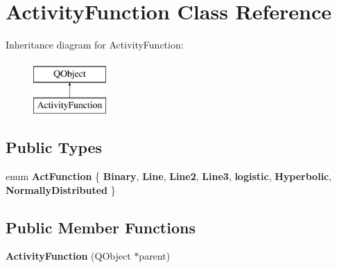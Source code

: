\hypertarget{class_activity_function}{}\section{Activity\+Function Class Reference}
\label{class_activity_function}
Inheritance diagram for Activity\+Function\+:\begin{figure}[H]
\begin{center}
\leavevmode
\includegraphics[height=2.000000cm]{class_activity_function}
\end{center}
\end{figure}
\subsection*{Public Types}
\begin{DoxyCompactItemize}
\item 
\hypertarget{class_activity_function_a53d67481011dce859413c787a1ba3ac9}{}\label{class_activity_function_a53d67481011dce859413c787a1ba3ac9} 
enum {\bfseries Act\+Function} \{ \newline
{\bfseries Binary}, 
{\bfseries Line}, 
{\bfseries Line2}, 
{\bfseries Line3}, 
\newline
{\bfseries logistic}, 
{\bfseries Hyperbolic}, 
{\bfseries Normally\+Distributed}
 \}
\end{DoxyCompactItemize}
\subsection*{Public Member Functions}
\begin{DoxyCompactItemize}
\item 
\hypertarget{class_activity_function_ad5ff6526b48659738800209a7c4584ae}{}\label{class_activity_function_ad5ff6526b48659738800209a7c4584ae} 
{\bfseries Activity\+Function} (Q\+Object $\ast$parent)
\end{DoxyCompactItemize}
